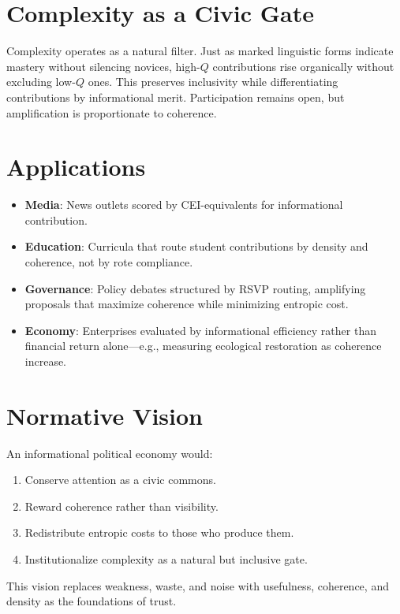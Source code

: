 \documentclass[openany]{book}
\begin{document}
\section{Complexity as a Civic Gate}

Complexity operates as a natural filter. Just as marked linguistic forms indicate mastery without silencing novices, high-$Q$ contributions rise organically without excluding low-$Q$ ones. This preserves inclusivity while differentiating contributions by informational merit. Participation remains open, but amplification is proportionate to coherence.

\section{Applications}

\begin{itemize}
    \item \textbf{Media}: News outlets scored by CEI-equivalents for informational contribution.
    \item \textbf{Education}: Curricula that route student contributions by density and coherence, not by rote compliance.
    \item \textbf{Governance}: Policy debates structured by RSVP routing, amplifying proposals that maximize coherence while minimizing entropic cost.
    \item \textbf{Economy}: Enterprises evaluated by informational efficiency rather than financial return alone---e.g., measuring ecological restoration as coherence increase.
\end{itemize}

\section{Normative Vision}

An informational political economy would:

\begin{enumerate}
    \item Conserve attention as a civic commons.
    \item Reward coherence rather than visibility.
    \item Redistribute entropic costs to those who produce them.
    \item Institutionalize complexity as a natural but inclusive gate.
\end{enumerate}

This vision replaces weakness, waste, and noise with usefulness, coherence, and density as the foundations of trust.
\end{document}
